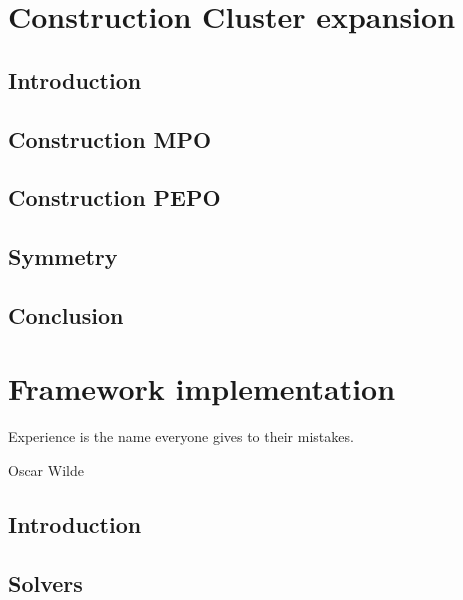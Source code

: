 \documentclass{book}
\newcounter{a}
\newcounter{b}
\begin{document}
\chapter{Construction Cluster expansion} \label{chap4}

\section{Introduction}


\section{Construction MPO}\label{H4_mpo_cons}


\section{Construction PEPO}\label{H4_pepo_cons}


\section{Symmetry}\label{sec:symm}


\section{Conclusion}


\chapter{Framework implementation}\label{chap5}



\epigraph{Experience is the name everyone gives to their mistakes.}{Oscar Wilde}

\section{Introduction}


\section{Solvers} \label{sec:framework_impl}

\end{document}
